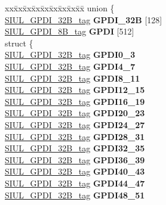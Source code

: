 \begin{DoxyCompactItemize}
\begin{tabbing}
\end{tabbing}\item 
\mbox{\label{structSIU__tag_a8943495ade995b2a8017521705ac6bd4}} 
\begin{tabbing}
xx\=xx\=xx\=xx\=xx\=xx\=xx\=xx\=xx\=\kill
union \{\\
\>\mbox{\hyperlink{unionSIUL__GPDI__32B__tag}{SIUL\_GPDI\_32B\_tag}} {\bfseries GPDI\_32B} \mbox{[}128\mbox{]}\\
\>\mbox{\hyperlink{unionSIUL__GPDI__8B__tag}{SIUL\_GPDI\_8B\_tag}} {\bfseries GPDI} \mbox{[}512\mbox{]}\\
\mbox{\label{unionSIU__tag_1_1_0D1544_a52e11dc6565bea0a429f0d5cb95a0477}} 
\>struct \{\\
\>\>\mbox{\hyperlink{unionSIUL__GPDI__32B__tag}{SIUL\_GPDI\_32B\_tag}} {\bfseries GPDI0\_3}\\
\>\>\mbox{\hyperlink{unionSIUL__GPDI__32B__tag}{SIUL\_GPDI\_32B\_tag}} {\bfseries GPDI4\_7}\\
\>\>\mbox{\hyperlink{unionSIUL__GPDI__32B__tag}{SIUL\_GPDI\_32B\_tag}} {\bfseries GPDI8\_11}\\
\>\>\mbox{\hyperlink{unionSIUL__GPDI__32B__tag}{SIUL\_GPDI\_32B\_tag}} {\bfseries GPDI12\_15}\\
\>\>\mbox{\hyperlink{unionSIUL__GPDI__32B__tag}{SIUL\_GPDI\_32B\_tag}} {\bfseries GPDI16\_19}\\
\>\>\mbox{\hyperlink{unionSIUL__GPDI__32B__tag}{SIUL\_GPDI\_32B\_tag}} {\bfseries GPDI20\_23}\\
\>\>\mbox{\hyperlink{unionSIUL__GPDI__32B__tag}{SIUL\_GPDI\_32B\_tag}} {\bfseries GPDI24\_27}\\
\>\>\mbox{\hyperlink{unionSIUL__GPDI__32B__tag}{SIUL\_GPDI\_32B\_tag}} {\bfseries GPDI28\_31}\\
\>\>\mbox{\hyperlink{unionSIUL__GPDI__32B__tag}{SIUL\_GPDI\_32B\_tag}} {\bfseries GPDI32\_35}\\
\>\>\mbox{\hyperlink{unionSIUL__GPDI__32B__tag}{SIUL\_GPDI\_32B\_tag}} {\bfseries GPDI36\_39}\\
\>\>\mbox{\hyperlink{unionSIUL__GPDI__32B__tag}{SIUL\_GPDI\_32B\_tag}} {\bfseries GPDI40\_43}\\
\>\>\mbox{\hyperlink{unionSIUL__GPDI__32B__tag}{SIUL\_GPDI\_32B\_tag}} {\bfseries GPDI44\_47}\\
\>\>\mbox{\hyperlink{unionSIUL__GPDI__32B__tag}{SIUL\_GPDI\_32B\_tag}} {\bfseries GPDI48\_51}\\

\end{tabbing}
\end{DoxyCompactItemize}

